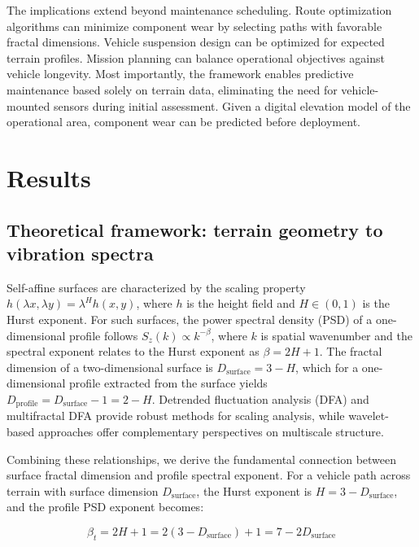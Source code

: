\documentclass[11pt,letterpaper]{article}
\begin{document}
The implications extend beyond maintenance scheduling. Route optimization algorithms can minimize component wear by selecting paths with favorable fractal dimensions. Vehicle suspension design can be optimized for expected terrain profiles. Mission planning can balance operational objectives against vehicle longevity. Most importantly, the framework enables predictive maintenance based solely on terrain data, eliminating the need for vehicle-mounted sensors during initial assessment. Given a digital elevation model of the operational area, component wear can be predicted before deployment.

\section{Results}

\subsection{Theoretical framework: terrain geometry to vibration spectra}

Self-affine surfaces are characterized by the scaling property $h(\lambda x, \lambda y) = \lambda^H h(x,y)$, where $h$ is the height field and $H \in (0,1)$ is the Hurst exponent\cite{MandelbrotVanNess1968}. For such surfaces, the power spectral density (PSD) of a one-dimensional profile follows $S_z(k) \propto k^{-\beta}$, where $k$ is spatial wavenumber and the spectral exponent relates to the Hurst exponent as $\beta = 2H + 1$\cite{MandelbrotVanNess1968}. The fractal dimension of a two-dimensional surface is $D_{\text{surface}} = 3 - H$\cite{Mandelbrot1982,Turcotte1997}, which for a one-dimensional profile extracted from the surface yields $D_{\text{profile}} = D_{\text{surface}} - 1 = 2 - H$. Detrended fluctuation analysis (DFA)\cite{Peng1994} and multifractal DFA\cite{Kantelhardt2002} provide robust methods for scaling analysis, while wavelet-based approaches\cite{Muzy1993,Mallat2009} offer complementary perspectives on multiscale structure.

Combining these relationships, we derive the fundamental connection between surface fractal dimension and profile spectral exponent. For a vehicle path across terrain with surface dimension $D_{\text{surface}}$, the Hurst exponent is $H = 3 - D_{\text{surface}}$, and the profile PSD exponent becomes:

\begin{equation}
\beta_t = 2H + 1 = 2(3 - D_{\text{surface}}) + 1 = 7 - 2D_{\text{surface}}
\end{equation}
\end{document}
